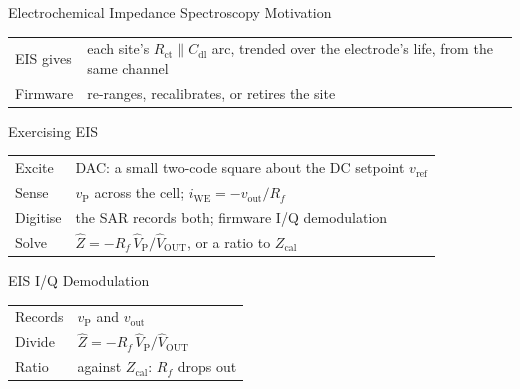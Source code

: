 \documentclass[10pt, aspectratio=169]{beamer}
\begin{document}
\begin{frame}{Electrochemical Impedance Spectroscopy Motivation}
\centering
\resizebox{0.95\linewidth}{!}{}
\vspace{0.4cm}

{\footnotesize
\begin{tabular}{@{}ll@{}}
EIS gives & each site's $R_{\mathrm{ct}} \parallel C_{\mathrm{dl}}$ arc, trended over the electrode's life, from the same channel \\
Firmware  & re-ranges, recalibrates, or retires the site \\
\end{tabular}}
\end{frame}

\begin{frame}{Exercising EIS}
\centering
\resizebox{0.9\linewidth}{!}{}

{\footnotesize
\begin{tabular}{@{}ll@{}}
Excite   & DAC: a small two-code square about the DC setpoint $v_{\mathrm{ref}}$ \\
Sense    & $v_{\mathrm{P}}$ across the cell; $i_{\mathrm{WE}} = -v_{\mathrm{out}}/R_f$ \\
Digitise & the SAR records both; firmware I/Q demodulation \\
Solve    & $\hat Z = -R_f\,\hat V_{\mathrm{P}}/\hat V_{\mathrm{OUT}}$, or a ratio to $Z_{\mathrm{cal}}$ \\
\end{tabular}}
\end{frame}

\begin{frame}{EIS I/Q Demodulation}
\centering
\resizebox{0.9\linewidth}{!}{}
\vspace{0.3cm}

{\footnotesize
\begin{tabular}{@{}ll@{}}
Records & $v_{\mathrm{P}}$ and $v_{\mathrm{out}}$ \\
Divide  & $\hat Z = -R_f\,\hat V_{\mathrm{P}}/\hat V_{\mathrm{OUT}}$ \\
Ratio   & against $Z_{\mathrm{cal}}$: $R_f$ drops out \\
\end{tabular}}
\end{frame}
\end{document}
